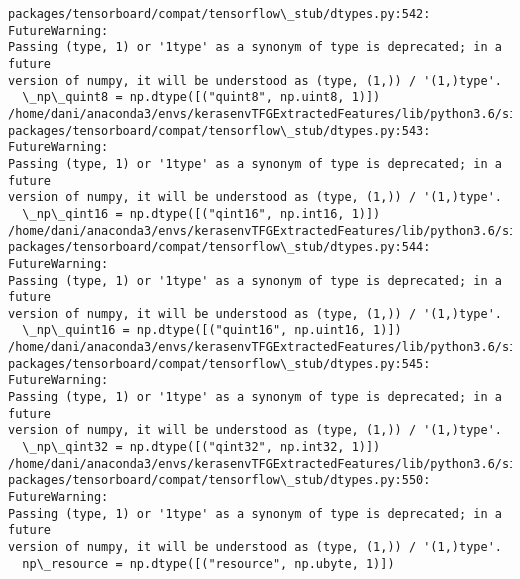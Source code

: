 \documentclass[11pt]{article}
\begin{document}
\begin{Verbatim}[commandchars=\\\{\}]
packages/tensorboard/compat/tensorflow\_stub/dtypes.py:542: FutureWarning:
Passing (type, 1) or '1type' as a synonym of type is deprecated; in a future
version of numpy, it will be understood as (type, (1,)) / '(1,)type'.
  \_np\_quint8 = np.dtype([("quint8", np.uint8, 1)])
/home/dani/anaconda3/envs/kerasenvTFGExtractedFeatures/lib/python3.6/site-
packages/tensorboard/compat/tensorflow\_stub/dtypes.py:543: FutureWarning:
Passing (type, 1) or '1type' as a synonym of type is deprecated; in a future
version of numpy, it will be understood as (type, (1,)) / '(1,)type'.
  \_np\_qint16 = np.dtype([("qint16", np.int16, 1)])
/home/dani/anaconda3/envs/kerasenvTFGExtractedFeatures/lib/python3.6/site-
packages/tensorboard/compat/tensorflow\_stub/dtypes.py:544: FutureWarning:
Passing (type, 1) or '1type' as a synonym of type is deprecated; in a future
version of numpy, it will be understood as (type, (1,)) / '(1,)type'.
  \_np\_quint16 = np.dtype([("quint16", np.uint16, 1)])
/home/dani/anaconda3/envs/kerasenvTFGExtractedFeatures/lib/python3.6/site-
packages/tensorboard/compat/tensorflow\_stub/dtypes.py:545: FutureWarning:
Passing (type, 1) or '1type' as a synonym of type is deprecated; in a future
version of numpy, it will be understood as (type, (1,)) / '(1,)type'.
  \_np\_qint32 = np.dtype([("qint32", np.int32, 1)])
/home/dani/anaconda3/envs/kerasenvTFGExtractedFeatures/lib/python3.6/site-
packages/tensorboard/compat/tensorflow\_stub/dtypes.py:550: FutureWarning:
Passing (type, 1) or '1type' as a synonym of type is deprecated; in a future
version of numpy, it will be understood as (type, (1,)) / '(1,)type'.
  np\_resource = np.dtype([("resource", np.ubyte, 1)])
    \end{Verbatim}
\end{document}
